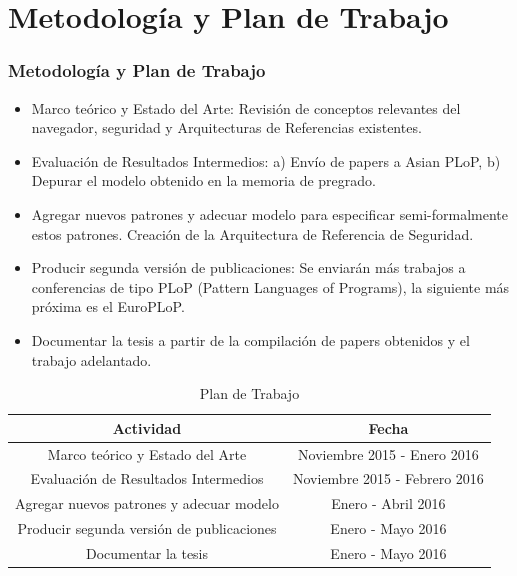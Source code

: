 \documentclass[serif,9pt]{beamer}
\begin{document}
\section{Metodología y Plan de Trabajo}
\begin{frame}
	\frametitle{Metodología y Plan de Trabajo}
	\begin{itemize}
		\item Marco teórico y Estado del Arte: Revisión de conceptos relevantes del navegador, seguridad y Arquitecturas de Referencias existentes.
		\item Evaluación de Resultados Intermedios: a) Envío de papers a Asian PLoP, b) Depurar el modelo obtenido en la memoria de pregrado.
		\item Agregar nuevos patrones y adecuar modelo para especificar semi-formalmente estos patrones. Creación de la Arquitectura de Referencia de Seguridad.
		\item Producir segunda versión de publicaciones: Se enviarán más trabajos a conferencias de tipo PLoP (Pattern Languages of Programs), la siguiente más próxima es el EuroPLoP.
		\item Documentar la tesis a partir de la compilación de papers obtenidos y el trabajo adelantado.
	\end{itemize}

	\begin{table}
        \begin{tabular}{|c|c|} 
        \hline        
        \textbf{Actividad} & \textbf{Fecha}\\
        \hline
        Marco teórico y Estado del Arte & Noviembre 2015 - Enero 2016\\
        \hline
        Evaluación de Resultados Intermedios & Noviembre 2015  - Febrero 2016\\
        \hline
        Agregar nuevos patrones y adecuar modelo & Enero - Abril 2016\\
        \hline
        Producir segunda versión de publicaciones & Enero - Mayo 2016\\
        \hline
        Documentar la tesis & Enero - Mayo 2016\\        
        \hline
        \end{tabular}
        \caption{Plan de Trabajo}
        \label{tab:trabajo}
    \end{table}
\end{frame}
\end{document}
